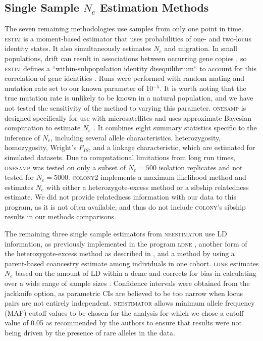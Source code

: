 \subsection{Single Sample $N_e$ Estimation Methods}
The seven remaining methodologies use samples from only one point in time. \textsc{estim} \citep{Vitalis:2001c} 
is a moment-based estimator that uses probabilities of one- and two-locus identity states. 
It also simultaneously estimates $N_e$ and migration. In small populations, drift 
can result in associations between occurring gene copies \citep{Hill:1968}, so \textsc{estim} 
defines a ``within-subpopulation identity disequilibrium`` to account for this correlation of 
gene identities \citep{Vitalis:2001a}. Runs were performed with random mating and 
mutation rate set to our known parameter of 10$^{-5}$. It is worth noting that the true mutation 
rate is unlikely to be known in a natural population, and we have not tested the sensitivity 
of the method to varying this parameter. \textsc{onesamp} is designed specifically for use 
with microsatellites and uses approximate Bayesian computation to estimate $N_e$ 
\citep{Tallmon:2008, Beaumont:2009}. It combines eight summary statistics specific 
to the inference of $N_e$, including several allele characteristics, heterozygosity, 
homozygosity, Wright's \emph{F}$_{IS}$, and a linkage characteristic, which are estimated for simulated 
datasets. Due to computational limitations from long run times, \textsc{onesamp} was tested 
on only a subset of $N_e = 500$ isolation replicates and not tested for $N_e = 5000$. 
\textsc{colony2} \citep{Wang:2009} implements a maximum likelihood method and estimates $N_e$ 
with either a heterozygote-excess method or a sibship relatedness estimate. We did not provide 
relatedness information with our data to this program, as it is not often available, and thus 
do not include \textsc{colony}'s sibship results in our methods comparisons.

The remaining three single sample estimators from \textsc{neestimator} use LD information, as previously 
implemented in the program \textsc{ldne} \citep{Waples:2008}, another form of the heterozygote-excess 
method as described in \citet{Pudovkin:1996}, and a method by \citet{Nomura:2008} using a parent-based coancestry 
estimate among individuals in one cohort. \textsc{ldne} estimates $N_e$ based on the 
amount of LD within a deme \citep{Hill:1981} and corrects for bias in calculating over a wide range of 
sample sizes \citep{Waples:2008}. Confidence intervals were obtained from the jackknife option, 
as parametric CIs are believed to be too narrow when locus pairs are not entirely independent. 
\textsc{neestimator} allows minimum allele frequency (MAF) cutoff values to be chosen for the analysis 
for which we chose a cutoff value of 0.05 as recommended by the authors to ensure that results were 
not being driven by the presence of rare alleles in the data.


